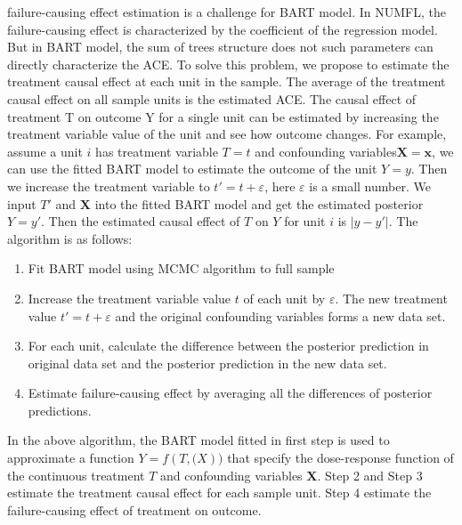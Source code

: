 failure-causing effect estimation is a challenge for BART model. In NUMFL, the failure-causing effect is characterized by the coefficient of the regression model.  But in BART model, the sum of trees structure does not such parameters can directly characterize the ACE. To solve this problem, we propose to estimate the treatment causal effect at each unit in the sample. The average of the treatment causal effect on all sample units is the estimated ACE. The causal effect of treatment T on outcome Y for a single unit can be estimated by increasing the treatment variable value of the unit and see how outcome changes. For example, assume a unit $i$ has treatment variable $T=t$ and confounding variables$\pmb {X}=\pmb {x}$, we can use the fitted BART model to estimate the outcome of the unit $Y=y$. Then we increase the treatment variable to $t'=t+\varepsilon$, here $\varepsilon $ is a small number. We input $T'$ and $\pmb{X}$ into the fitted BART model and get the estimated posterior $Y=y'$. Then the estimated causal effect of $T$ on $Y$ for unit $i$ is $\left| {y - y'} \right|$. The algorithm is as follows:
\begin{enumerate}
\item Fit BART model using MCMC algorithm to full sample
\item Increase the treatment variable value $t$ of each unit by $\varepsilon $. The new treatment value $t'=t+\varepsilon$ and the original confounding variables forms a new data set.
\item For each unit, calculate the difference between the posterior prediction in original data set and the posterior prediction in the new data set.
\item Estimate failure-causing effect by averaging all the differences of posterior predictions.
\end{enumerate}

In the above algorithm, the BART model fitted in first step is used to approximate a function $Y=f(T,\pmb(X))$ that specify the dose-response function of the continuous treatment $T$ and confounding variables $\pmb{X}$. Step 2 and Step 3 estimate the treatment causal effect for each sample unit. Step 4 estimate the failure-causing effect of treatment on outcome.

